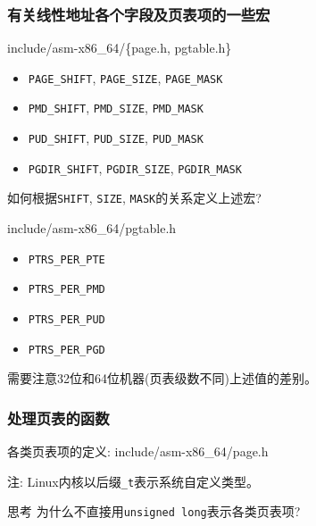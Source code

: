 \documentclass[xcolor=svgnames]{beamer}
\begin{document}
\begin{CJK*}{UTF8}{gbsn}
\begin{frame}[fragile]
\frametitle{有关线性地址各个字段及页表项的一些宏}
\begin{block}{include/asm-x86\_64/\{page.h, pgtable.h\}}
\begin{itemize}
\item \verb|PAGE_SHIFT|, \verb|PAGE_SIZE|, \verb|PAGE_MASK|
\item \verb|PMD_SHIFT|, \verb|PMD_SIZE|, \verb|PMD_MASK|
\item \verb|PUD_SHIFT|, \verb|PUD_SIZE|, \verb|PUD_MASK|
\item \verb|PGDIR_SHIFT|, \verb|PGDIR_SIZE|, \verb|PGDIR_MASK|
\end{itemize}
如何根据\verb|SHIFT|, \verb|SIZE|, \verb|MASK|的关系定义上述宏?
\end{block}
\begin{block}{include/asm-x86\_64/pgtable.h}
\begin{itemize}
\item \verb|PTRS_PER_PTE|
\item \verb|PTRS_PER_PMD|
\item \verb|PTRS_PER_PUD|
\item \verb|PTRS_PER_PGD|
\end{itemize}
需要注意32位和64位机器(页表级数不同)上述值的差别。
\end{block}
\end{frame}


\begin{frame}[fragile]
\frametitle{处理页表的函数}
\begin{block}{各类页表项的定义: include/asm-x86\_64/page.h}
\lstptet

注: Linux内核以后缀\verb|_t|表示系统自定义类型。
\end{block}
\begin{block}{思考}
为什么不直接用\verb|unsigned long|表示各类页表项?
\end{block}
\end{frame}

\end{CJK*}
\end{document}
